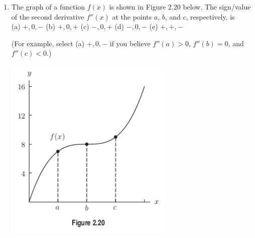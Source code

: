 \documentclass[fleqn,12pt]{article}
\newcommand{\<}{\ensuremath{\langle}}
\renewcommand{\>}{\ensuremath{\rangle}}
\begin{document}
\begin{enumerate}
\vskip1cm





\item %
\label{item:12}
The graph of a function $f(x)$ is shown in Figure 2.20 below.  The 
sign/value of the second derivative $f''(x)$ at the points $a$, $b$, and $c$,
respectively, is\\[4pt] 
(a) $+, 0, -$ \hfill %
(b) $+, 0, +$\hfill %
(c) $-, 0, +$\hfill %
(d) $-, 0, -$\hfill %
(e) $+, +, -$\hfill %

\smallskip
(For example, select (a) $+, 0, -$ if you believe $f''(a)>0$, $f''(b)=0$, and $f''(c)<0$.)
\begin{center}
  \includegraphics[height=3.5in]{Problem-CT-2-4-9}
\end{center}


\newpage



\end{enumerate}
\end{document}

